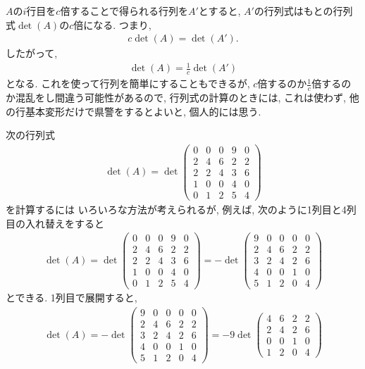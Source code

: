 \begin{remark}
  $A$の$i$行目を$c$倍することで得られる行列を$A'$とすると,
  $A'$の行列式はもとの行列式$\det(A)$の$c$倍になる.
  つまり,
  \begin{align*}
    c\det(A)=\det(A').
  \end{align*}
  したがって,
  \begin{align*}
    \det(A)=\frac{1}{c}\det(A')
  \end{align*}
  となる.
  これを使って行列を簡単にすることもできるが,
  $c$倍するのか$\frac{1}{c}$倍するのか混乱をし間違う可能性があるので,
  行列式の計算のときには, これは使わず, 他の行基本変形だけで県警をするとよいと,
  個人的には思う.
\end{remark}

次の行列式
\begin{align*}
  \det(A)=
  \det
  \begin{pmatrix}
  0&0&0&9&0\\
  2&4&6&2&2\\
  2&2&4&3&6\\
  1&0&0&4&0\\
  0&1&2&5&4
  \end{pmatrix}
\end{align*}
を計算するには
いろいろな方法が考えられるが,
例えば, 次のように1列目と4列目の入れ替えをすると
\begin{align*}
  \det(A)=
  \det
  \begin{pmatrix}
  0&0&0&9&0\\
  2&4&6&2&2\\
  2&2&4&3&6\\
  1&0&0&4&0\\
  0&1&2&5&4
  \end{pmatrix}
  =
  -\det
  \begin{pmatrix}
  9&0&0&0&0\\
  2&4&6&2&2\\
  3&2&4&2&6\\
  4&0&0&1&0\\
  5&1&2&0&4
  \end{pmatrix}
\end{align*}
とできる.
1列目で展開すると,
\begin{align*}
  \det(A)
  =
  -\det
  \begin{pmatrix}
  9&0&0&0&0\\
  2&4&6&2&2\\
  3&2&4&2&6\\
  4&0&0&1&0\\
  5&1&2&0&4
  \end{pmatrix}
  =
  -9\det
  \begin{pmatrix}
  4&6&2&2\\
  2&4&2&6\\
  0&0&1&0\\
  1&2&0&4
  \end{pmatrix}
\end{align*}
